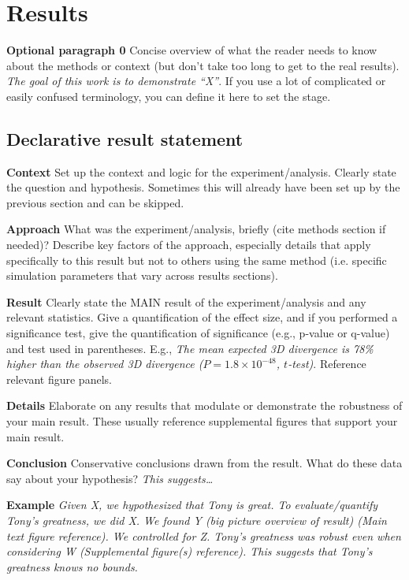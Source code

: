 


\section{Results}
\resultsTips %
\textbf{Optional paragraph 0} Concise overview of what the reader needs to know about the methods or context (but don’t take too long to get to the real results). \textit{The goal of this work is to demonstrate “X”}. If you use a lot of complicated or easily confused terminology, you can define it here to set the stage. 

\subsection{Declarative result statement}
\textbf{Context} Set up the context and logic for the experiment/analysis. Clearly state the question and hypothesis. Sometimes this will already have been set up by the previous section and can be skipped.

\noindent\textbf{Approach} What was the experiment/analysis, briefly (cite methods section if needed)? Describe key factors of the approach, especially details that apply specifically to this result but not to others using the same method (i.e. specific simulation parameters that vary across results sections).

\noindent\textbf{Result} Clearly state the MAIN result of the experiment/analysis and any relevant statistics. Give a quantification of the effect size, and if you performed a significance test, give the quantification of significance (e.g., p-value or q-value) and test used in parentheses. E.g., \textit{The mean expected 3D divergence is 78\% higher than the observed 3D divergence (\(P = 1.8\times10^{-48}\), \(t\)-test)}. Reference relevant figure panels.

\noindent\textbf{Details} Elaborate on any results that modulate or demonstrate the robustness of your main result. These usually reference supplemental figures that support your main result.

\noindent\textbf{Conclusion} Conservative conclusions drawn from the result. What do these data say about your hypothesis? \textit{This suggests\dots} 

\textbf{Example} \textit{Given X, we hypothesized that Tony is great. To evaluate/quantify Tony’s greatness, we did X. We found Y (big picture overview of result) (Main text figure reference). We controlled for Z. Tony’s greatness was robust even when considering W (Supplemental figure(s) reference). This suggests that Tony's greatness knows no bounds.}

